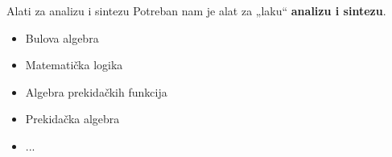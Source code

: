 \begin{frame}[label=01-s004]{Alati za analizu i sintezu}
\medskip Potreban nam je alat za „laku“ \textbf{analizu i sintezu}.
\begin{itemize}\item Bulova algebra\item Matematička logika\item Algebra prekidačkih funkcija\item Prekidačka algebra\item ...\end{itemize}
\end{frame}
